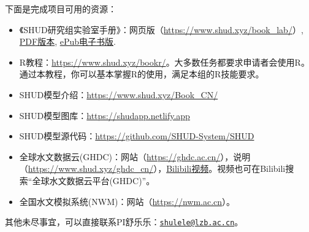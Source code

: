 \documentclass[
]{book}
\providecommand{\tightlist}{%
  \setlength{\itemsep}{0pt}\setlength{\parskip}{0pt}}
\begin{document}
下面是完成项目可用的资源：

\begin{itemize}
\tightlist
\item
  《SHUD研究组实验室手册》：网页版（\url{https://www.shud.xyz/book_lab/}）, \href{https://www.shud.xyz/book_lab/_main.pdf}{PDF版本}, \href{https://www.shud.xyz/book_lab/_main.pdf}{ePub电子书版}.
\item
  R教程：\url{https://www.shud.xyz/bookr/}。大多数任务都要求申请者会使用R。通过本教程，你可以基本掌握R的使用，满足本组的R技能要求。
\item
  SHUD模型介绍：\url{https://www.shud.xyz/Book_CN/}
\item
  SHUD模型图库：\url{https://shudapp.netlify.app}
\item
  SHUD模型源代码：\url{https://github.com/SHUD-System/SHUD}
\item
  全球水文数据云(GHDC)：网站（\url{https://ghdc.ac.cn/}），说明（\url{https://www.shud.xyz/ghdc_cn/}），\href{https://www.bilibili.com/video/BV1Km4y147Wz/?vd_source=50ff6ac37242c790173c755375aa0e4a}{Bilibili视频}。视频也可在Bilibili搜索``全球水文数据云平台(GHDC)''。
\item
  全国水文模拟系统(NWM)：网站（\url{https://nwm.ac.cn}）。
\end{itemize}

其他未尽事宜，可以直接联系PI舒乐乐：\href{mailto:shulele@lzb.ac.cn}{\nolinkurl{shulele@lzb.ac.cn}}。

  
\end{document}
